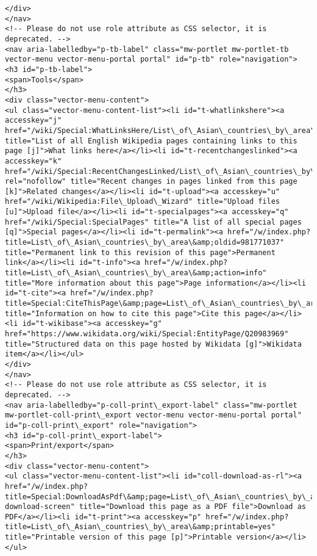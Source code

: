 \documentclass[11pt]{article}
\begin{document}
\begin{Verbatim}[commandchars=\\\{\}]
</div>
</nav>
<!-- Please do not use role attribute as CSS selector, it is deprecated. -->
<nav aria-labelledby="p-tb-label" class="mw-portlet mw-portlet-tb vector-menu vector-menu-portal portal" id="p-tb" role="navigation">
<h3 id="p-tb-label">
<span>Tools</span>
</h3>
<div class="vector-menu-content">
<ul class="vector-menu-content-list"><li id="t-whatlinkshere"><a accesskey="j" href="/wiki/Special:WhatLinksHere/List\_of\_Asian\_countries\_by\_area" title="List of all English Wikipedia pages containing links to this page [j]">What links here</a></li><li id="t-recentchangeslinked"><a accesskey="k" href="/wiki/Special:RecentChangesLinked/List\_of\_Asian\_countries\_by\_area" rel="nofollow" title="Recent changes in pages linked from this page [k]">Related changes</a></li><li id="t-upload"><a accesskey="u" href="/wiki/Wikipedia:File\_Upload\_Wizard" title="Upload files [u]">Upload file</a></li><li id="t-specialpages"><a accesskey="q" href="/wiki/Special:SpecialPages" title="A list of all special pages [q]">Special pages</a></li><li id="t-permalink"><a href="/w/index.php?title=List\_of\_Asian\_countries\_by\_area\&amp;oldid=981771037" title="Permanent link to this revision of this page">Permanent link</a></li><li id="t-info"><a href="/w/index.php?title=List\_of\_Asian\_countries\_by\_area\&amp;action=info" title="More information about this page">Page information</a></li><li id="t-cite"><a href="/w/index.php?title=Special:CiteThisPage\&amp;page=List\_of\_Asian\_countries\_by\_area\&amp;id=981771037\&amp;wpFormIdentifier=titleform" title="Information on how to cite this page">Cite this page</a></li><li id="t-wikibase"><a accesskey="g" href="https://www.wikidata.org/wiki/Special:EntityPage/Q20983969" title="Structured data on this page hosted by Wikidata [g]">Wikidata item</a></li></ul>
</div>
</nav>
<!-- Please do not use role attribute as CSS selector, it is deprecated. -->
<nav aria-labelledby="p-coll-print\_export-label" class="mw-portlet mw-portlet-coll-print\_export vector-menu vector-menu-portal portal" id="p-coll-print\_export" role="navigation">
<h3 id="p-coll-print\_export-label">
<span>Print/export</span>
</h3>
<div class="vector-menu-content">
<ul class="vector-menu-content-list"><li id="coll-download-as-rl"><a href="/w/index.php?title=Special:DownloadAsPdf\&amp;page=List\_of\_Asian\_countries\_by\_area\&amp;action=show-download-screen" title="Download this page as a PDF file">Download as PDF</a></li><li id="t-print"><a accesskey="p" href="/w/index.php?title=List\_of\_Asian\_countries\_by\_area\&amp;printable=yes" title="Printable version of this page [p]">Printable version</a></li></ul>

\end{Verbatim}
\end{document}
